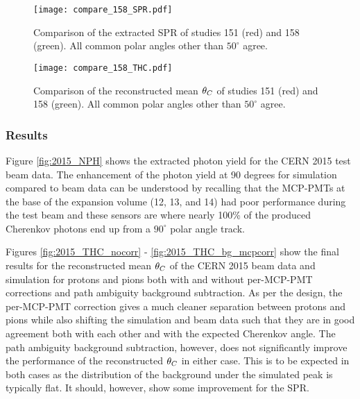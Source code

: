 \begin{figure}[!htb]
	\centering
	\texttt{[image: compare\_158\_SPR.pdf]}
	\caption{Comparison of the extracted SPR of studies 151 (red) and 158 (green). All common polar angles other than $50^\circ$ agree.}
	\label{fig:compare_158_SPR}
\end{figure}

\begin{figure}[!htb]
	\centering
	\texttt{[image: compare\_158\_THC.pdf]}
	\caption{Comparison of the reconstructed mean $\theta_{C}$ of studies 151 (red) and 158 (green). All common polar angles other than $50^\circ$ agree.}
	\label{fig:compare_158_THC}
\end{figure}

\subsubsection{Results}
Figure \ref{fig:2015_NPH} shows the extracted photon yield for the CERN 2015 test beam data. The enhancement of the photon yield at 90 degrees for simulation compared to beam data can be understood by recalling that the MCP-PMTs at the base of the expansion volume (12, 13, and 14) had poor performance during the test beam and these sensors are where nearly 100\% of the produced Cherenkov photons end up from a $90^\circ$ polar angle track.

Figures \ref{fig:2015_THC_nocorr} - \ref{fig:2015_THC_bg_mcpcorr} show the final results for the reconstructed mean $\theta_{C}$ of the CERN 2015 beam data and simulation for protons and pions both with and without per-MCP-PMT corrections and path ambiguity background subtraction. As per the design, the per-MCP-PMT correction gives a much cleaner separation between protons and pions while also shifting the simulation and beam data such that they are in good agreement both with each other and with the expected Cherenkov angle. The path ambiguity background subtraction, however, does not significantly improve the performance of the reconstructed $\theta_{C}$ in either case. This is to be expected in both cases as the distribution of the background under the simulated peak is typically flat. It should, however, show some improvement for the SPR.

